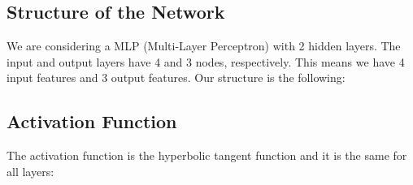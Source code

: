 \documentclass{article}
\def\nstyle{int(\lay<\Nnodlen?min(2,\lay):3)} %
\begin{document}
\subsection*{Structure of the Network}

We are considering a MLP (Multi-Layer Perceptron) with 2 hidden layers. The input and output layers have 4 and 3 nodes, respectively. This means we have 4 input features and 3 output features. 
Our structure is the following:

\begin{center}
\end{center}

\subsection*{Activation Function}

The activation function is the hyperbolic tangent function and it is the same for all layers:
\end{document}
